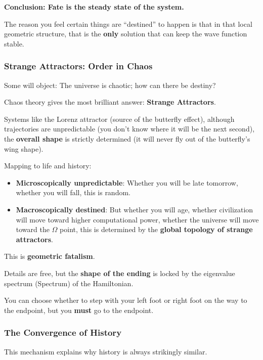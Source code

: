 \textbf{Conclusion: Fate is the steady state of the system.}

The reason you feel certain things are ``destined'' to happen is that in that local geometric structure, that is the \textbf{only} solution that can keep the wave function stable.

\subsubsection{Strange Attractors: Order in Chaos}

Some will object: The universe is chaotic; how can there be destiny?

Chaos theory gives the most brilliant answer: \textbf{Strange Attractors}.

Systems like the Lorenz attractor (source of the butterfly effect), although trajectories are unpredictable (you don't know where it will be the next second), the \textbf{overall shape} is strictly determined (it will never fly out of the butterfly's wing shape).

Mapping to life and history:

\begin{itemize}
\item \textbf{Microscopically unpredictable}: Whether you will be late tomorrow, whether you will fall, this is random.

\item \textbf{Macroscopically destined}: But whether you will age, whether civilization will move toward higher computational power, whether the universe will move toward the $\Omega$ point, this is determined by the \textbf{global topology of strange attractors}.
\end{itemize}

This is \textbf{geometric fatalism}.

Details are free, but the \textbf{shape of the ending} is locked by the eigenvalue spectrum (Spectrum) of the Hamiltonian.

You can choose whether to step with your left foot or right foot on the way to the endpoint, but you \textbf{must} go to the endpoint.

\subsubsection{The Convergence of History}

This mechanism explains why history is always strikingly similar.

